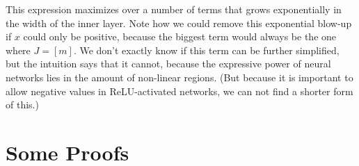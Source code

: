 This expression maximizes over a number of terms that grows exponentially in the width of the inner layer.
Note how we could remove this exponential blow-up if $x$ could only be positive, because the biggest term would always be the one where $J = [m]$.
We don't exactly know if this term can be further simplified, but the intuition says that it cannot, because the expressive power of neural networks lies in the amount of non-linear regions.
(But because it is important to allow negative values in ReLU-activated networks, we can not find a shorter form of this.)



\section{Some Proofs}

\blindtext[1]